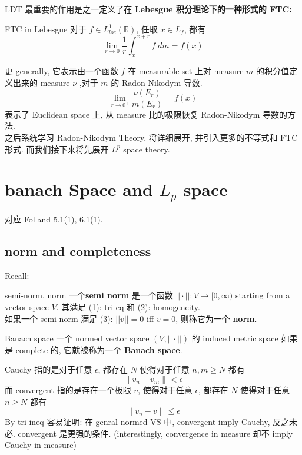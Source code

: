 \documentclass[lang=cn,11pt]{elegantbook}
\begin{document}
\begin{remark}
    
   LDT 最重要的作用是之一定义了在 \textbf{Lebesgue 积分理论下的一种形式的 FTC: }
   \begin{theorem}{FTC in Lebesgue }
对于 $f \in L^1 _{loc}(\mathbb{R})$, 任取 $x \in L_f$, 都有 \[
\lim_{r\to 0} \frac{1}{r} \int_x ^{x+r} f\; dm = f(x)
\]
\end{theorem}
更 generally, 它表示由一个函数 $f$ 在 measurable set 上对 measure $m$ 的积分值定义出来的 measure $\nu$ ,对于 $m$ 的 Radon-Nikodym 导数.
\[
\lim_{r\to 0^+} \frac{\nu(E_r)}{m(E_r)} = f(x)
\]
表示了 Euclidean space 上, 从 measure 比的极限恢复 Radon-Nikodym 导数的方法.\\
之后系统学习 Radon-Nikodym Theory, 将详细展开, 并引入更多的不等式和 FTC 形式. 而我们接下来将先展开 $L^p$ space theory.
\end{remark}






\chapter{banach Space and $L_p$ space}
对应  Folland 5.1(1), 6.1(1).
\section{norm and completeness}
Recall:
\begin{definition}{semi-norm, norm}
  一个\textbf{semi norm} 是一个函数 $||\cdot||: V \to [0,\infty)$ starting from a vector space $V$. 其满足 (1): tri eq 和 (2): homogeneity.\\
   如果一个 semi-norm 满足 (3): $||v|| = 0$ iff $v = 0$, 则称它为一个 \textbf{norm}.
\end{definition}

\begin{definition}{Banach space}
一个 normed vector space $(V, ||\cdot||)$ 的 induced metric space 如果是 complete 的, 它就被称为一个 \textbf{Banach space}.\\
\end{definition}
\begin{remark}
    Cauchy 指的是对于任意 $\epsilon$, 都存在 $N$ 使得对于任意 $n,m \geq N$ 都有 \[
    \| v_n - v_m\| < \epsilon
    \]
而 convergent 指的是存在一个极限 $v$, 使得对于任意 $\epsilon$, 都存在 $N$ 使得对于任意 $n\geq N$ 都有 \[
\|v_n - v\| \leq \epsilon
\]
By tri ineq 容易证明: 在 genral normed VS 中, convergent imply Cauchy, 反之未必. convergent 是更强的条件. (interestingly, convergence in measure 却不 imply Cauchy in measure)
\end{remark}
\end{document}
